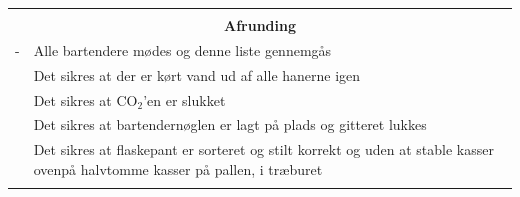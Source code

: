 \documentclass[a4paper,10pt,oneside,article]{memoir}
\begin{document}
\vspace{0.5cm}
\noindent
\begin{tabular}{|l|l|}
    \hline
    \multicolumn{2}{|c|}{} \\
    \multicolumn{2}{|c|}{\Large \textbf{Afrunding}} \\
    \hline
    \begin{minipage}[t]{0.15\textwidth}
        {\color{white}-}
    \end{minipage} & 
    \begin{minipage}[t]{0.80\textwidth}
        Alle bartendere mødes og denne liste gennemgås
    \end{minipage} \\
    \hline
    \begin{minipage}[t]{0.15\textwidth}
    \end{minipage} & 
    \begin{minipage}[t]{0.80\textwidth}
        Det sikres at der er kørt vand ud af alle hanerne igen
    \end{minipage} \\
    \hline
    \begin{minipage}[t]{0.15\textwidth}
    \end{minipage} & 
    \begin{minipage}[t]{0.80\textwidth}
        Det sikres at CO$_2$'en er slukket
    \end{minipage} \\
    \hline
    \begin{minipage}[t]{0.15\textwidth}
    \end{minipage} & 
    \begin{minipage}[t]{0.80\textwidth}
        Det sikres at bartendernøglen er lagt på plads og gitteret lukkes
    \end{minipage} \\
    \hline
    \begin{minipage}[t]{0.15\textwidth}
    \end{minipage} & 
    \begin{minipage}[t]{0.80\textwidth}
        Det sikres at flaskepant er sorteret og stilt korrekt og uden at stable kasser ovenpå 
        halvtomme kasser på pallen, i træburet
    \end{minipage} \\
    \hline
    \begin{minipage}[t]{0.15\textwidth}
    \end{minipage} & 
    \begin{minipage}[t]{0.80\textwidth}

\end{minipage}
\end{tabular}
\end{document}
